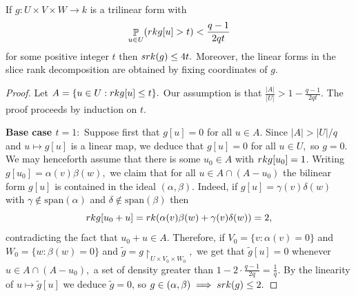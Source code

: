 \documentclass[10pt,a4paper]{amsart}
\newcommand{\rk}{\textnormal{rk}}
\newcommand{\srk}{\textnormal{srk}}
\renewcommand{\P}{\mathop{\mathbb{P}}}
\begin{document}
\begin{lemma}\label{low-rk-der}
    If $g:U\times V\times W\to k$ is a trilinear form with
    $$\P_{u\in U} (\rk g[u] > t) < \frac{q-1}{2qt}$$ for some positive integer $t$ then $\srk (g) \le 4t.$ Moreover, the linear forms in the slice rank decomposition are obtained by fixing coordinates of $g.$
    \end{lemma}

    \begin{proof}
         Let $A = \{u\in U: \rk g[u] \le t \}.$ Our assumption is that $\frac{|A|}{|U|} > 1-\frac{q-1}{2qt}.$ The proof proceeds by induction on $t.$
         
         \textbf{Base case $t=1:$} Suppose first that $g[u] = 0$ for all $u\in A.$ Since $|A| > |U|/q$ and $u\mapsto g[u]$ is a linear map, we deduce that $g[u] = 0$ for all $u\in U,$ so $g = 0.$  We may henceforth assume that there is some $u_0\in A$ with $\rk g[u_0] = 1$. Writing $g[u_0] = \alpha(v)\beta(w),$ we claim that for all $u\in A\cap (A-u_0)$ the bilinear form $g[u]$ is contained in the ideal $(\alpha,\beta).$  Indeed, if $g[u] = \gamma(v)\delta(w)$ with $\gamma \not\in \text{span}(\alpha)$ and $\delta\not\in\text{span}(\beta)$ then 
         \[
         \rk g[u_0+u] = \rk(\alpha(v)\beta(w)+\gamma(v)\delta(w)) = 2,
         \]
         contradicting the fact that $u_0+u \in A.$ Therefore, if $V_0 = \{v: \alpha(v) = 0\}$ and $W_0 = \{w: \beta(w) = 0\}$ and $\tilde g = g\restriction_{U\times V_0\times W_0},$ we get that $\tilde g[u] = 0$ whenever $u\in A\cap (A-u_0),$  a set of density greater than $ 1- 2\cdot \frac{q-1}{2q} = \frac{1}{q}.$ By the linearity of $u\mapsto \tilde g[u]$ we deduce $\tilde g = 0$, so $g\in(\alpha,\beta)\implies \srk(g) \le 2.$ 


\end{proof}
\end{document}

